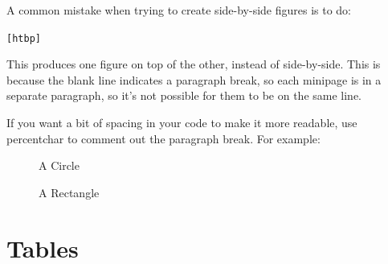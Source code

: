 A common mistake when trying to create side-by-side figures is
to do:
\begin{alltt}
[htbp]
\wrong
\end{alltt}
This produces one figure on top of the other, instead of
side-by-side. This is because the blank
line indicates a paragraph break, so each minipage is in a separate
paragraph, so it's not possible for them to be on the same line.

If you want a bit of spacing in your code to make it more readable,
use \gls{percentchar} to comment out the paragraph break. For
example:
\begin{alltt}
%
\correct{}
\end{alltt}


\begin{figure}[htbp]
  \begin{makeimage}\end{makeimage}
  \begin{minipage}{0.5\linewidth}
    \centering
    \caption{A Circle}
    \label{fig:circle-sbs}
  \end{minipage}%
  \begin{minipage}{0.5\linewidth}
    \centering
    \caption{A Rectangle}
    \label{fig:rectangle-sbs}
  \end{minipage}
\end{figure}


\section{Tables}
\label{sec:tables}

